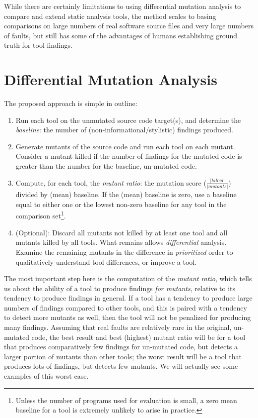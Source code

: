 While there are certainly limitations to using differential mutation analysis to compare and extend static analysis tools, the method scales to basing comparisons on large numbers of real software source files and very large numbers of faults, but still has some of the advantages of humans establishing ground truth for tool findings.

 \section{Differential Mutation Analysis}
 \label{sec:method}

The proposed approach is simple in outline:

\begin{enumerate}
\item Run each tool on the unmutated source code target(s), and determine the \emph{baseline}: the number of (non-informational/stylistic) findings produced.
\item Generate mutants of the source code and run each tool on each mutant.  Consider a mutant killed if the number of findings for the mutated code is greater than the number for the baseline, un-mutated code.
\item Compute, for each tool, the \emph{mutant ratio}:  the mutation score ($\frac{|\mathit{killed}|}{|\mathit{mutants}|}$) divided by (mean) baseline.  If the (mean) baseline is zero, use a baseline equal to either one or the lowest non-zero baseline for any tool in the comparison set\footnote{Unless the number of programs used for evaluation is small, a zero mean baseline for a tool is extremely unlikely to arise in practice.}.
\item (Optional): Discard all mutants not killed by at least one tool and all mutants killed by all tools.  What remains allows \emph{differential} analysis.
Examine the remaining mutants in the difference in \emph{prioritized} order to qualitatively understand tool differences, or improve a tool.
\end{enumerate}

The most important step here is the computation of the \emph{mutant ratio}, which tells us about the ability of a tool to produce findings \emph{for mutants}, relative to its tendency to produce findings in general.  If a tool has a tendency to produce large numbers of findings compared to other tools, and this is paired with a tendency to detect more mutants as well, then the tool will not be penalized for producing many findings.  Assuming that real faults are relatively rare in the original, un-mutated code, the best result and best (highest) mutant ratio will be for a tool that produces comparatively few findings for un-mutated code, but detects a larger portion of mutants than other tools; the worst result will be a tool that produces lots of findings, but detects few mutants.  We will actually see some examples of this worst case.

